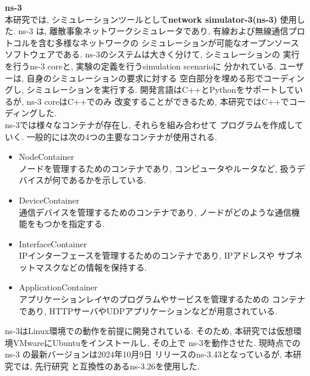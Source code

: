 {\LARGE\textbf{ns-3}}\\[1em]
\indent 本研究では, シミュレーションツールとして\textbf{network simulator-3(ns-3)}
\cite{ns-3}使用した. ns-3 は, 離散事象ネットワークシミュレータであり, 
有線および無線通信プロトコルを含む多様なネットワークの
シミュレーションが可能なオープンソースソフトウェアである. 
ns-3のシステムは大きく分けて, シミュレーションの
実行を行うns-3 coreと, 実験の定義を行うsimulation scenarioに
分かれている. ユーザーは, 自身のシミュレーションの要求に対する
空白部分を埋める形でコーディングし, シミュレーションを実行する. 
開発言語はC++とPythonをサポートしているが, ns-3 coreはC++でのみ
改変することができるため, 本研究ではC++でコーディングした.\\
\indent ns-3では様々なコンテナが存在し, それらを組み合わせて
プログラムを作成していく. 一般的には次の4つの主要なコンテナが使用される.
\begin{itemize}
  \item NodeContainer\\ 
  \indent ノードを管理するためのコンテナであり, 
  コンピュータやルータなど, 扱うデバイスが何であるかを示している. 
  \item DeviceContainer\\
  \indent 通信デバイスを管理するためのコンテナであり, 
  ノードがどのような通信機能をもつかを指定する. 
  \item InterfaceContainer\\
  \indent IPインターフェースを管理するためのコンテナであり, IPアドレスや
  サブネットマスクなどの情報を保持する.
  \item ApplicationContainer\\
  \indent アプリケーションレイヤのプログラムやサービスを管理するための
  コンテナであり, HTTPサーバやUDPアプリケーションなどが用意されている.
\end{itemize}

ns-3はLinux環境での動作を前提に開発されている. そのため, 
本研究では仮想環境VMwareにUbuntuをインストールし, その上で
ns-3を動作させた. 現時点での ns-3 の最新バージョンは2024年10月9日
リリースのns-3.43となっているが, 本研究では, 先行研究
\cite{shinato}と互換性のあるns-3.26を使用した. \\[1em]


 
